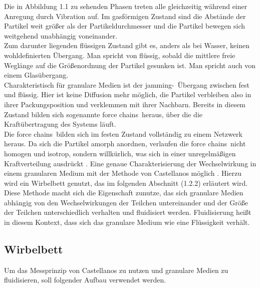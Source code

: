 Die in Abbildung 1.1 zu sehenden Phasen treten alle gleichzeitig während einer Anregung durch Vibration auf. Im gasförmigen Zustand sind die Abstände der Partikel weit größer als der Partikeldurchmesser und die Partikel bewegen sich weitgehend unabhängig voneinander. \\
Zum darunter liegenden flüssigen Zustand gibt es, anders als bei Wasser, keinen wohldefinierten Übergang. Man spricht von flüssig, sobald die mittlere freie Weglänge auf die Größenordnung der Partikel gesunken ist. Man spricht auch von einem Glasübergang. \\
Charakteristisch für granulare Medien ist der \glqq jamming\grqq-\ Übergang zwischen fest und flüssig. Hier ist keine Diffusion mehr möglich, die Partikel verbleiben also in ihrer Packungsposition und verklemmen mit ihrer Nachbarn. Bereits in diesem Zustand bilden sich sogenannte \glqq force chains\grqq \ heraus, über die die Kraftübertragung des Systems läuft. \\
Die \glqq force chains\grqq \ bilden sich im festen Zustand vollständig zu einem Netzwerk heraus. Da sich die Partikel amorph anordnen, verlaufen die \glqq force chains\grqq \ nicht homogen und isotrop, sondern willkürlich, was sich in einer unregelmäßigen Kraftverteilung ausdrückt \cite{Darmstadt2015, Fallturmexperiment}.
Eine genaue Charakterisierung der Wechselwirkung in einem granularen Medium mit der Methode von Castellanos möglich \cite{Castellanos2000}. Hierzu wird ein Wirbelbett genutzt, das im folgenden Abschnitt (1.2.2) erläutert wird. Diese Methode macht sich die Eigenschaft zunutze, das sich granulare Medien abhängig von den Wechselwirkungen der Teilchen untereinander und der Größe der Teilchen unterschiedlich verhalten und fluidisiert werden. Fluidisierung heißt in diesem Kontext, dass sich das granulare Medium wie eine Flüssigkeit verhält.

\subsection{Wirbelbett}

Um das Messprinzip von Castellanos zu nutzen und granulare Medien zu fluidisieren, soll folgender Aufbau verwendet werden.


